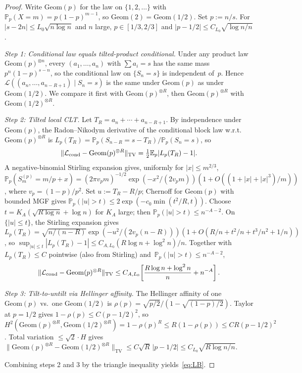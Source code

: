 \documentclass[11pt,a4paper]{amsart}
\theoremstyle{plain}
\theoremstyle{definition}
\newcommand{\E}{\mathbb{E}}
\newcommand{\PP}{\mathbb{P}}
\newcommand{\TV}{\mathrm{TV}}
\newcommand{\Geom}{\mathrm{Geom}}
\begin{document}
\begin{proof}
Write $\Geom(p)$ for the law on $\{1,2,\dots\}$ with $\PP_p(X=m)=p(1-p)^{m-1}$,
so $\Geom(2)=\Geom(1/2)$.
Set $p:=n/s$.
For $|s-2n|\le L_0\sqrt{n\log n}$ and $n$ large, $p\in[1/3,2/3]$ and
$|p-1/2|\le C_{L_0}\sqrt{\log n/n}$.

\smallskip\noindent\emph{Step 1: Conditional law equals tilted-product conditional.}
Under any product law $\Geom(p)^{\otimes n}$, every $(a_1,\dots,a_n)$ with
$\sum a_i=s$ has the same mass $p^n(1-p)^{s-n}$, so the conditional law on
$\{S_n=s\}$ is independent of~$p$.
Hence
$\mathcal L((a_n,\dots,a_{n-R+1})\mid S_n=s)$ is the same under $\Geom(p)$
as under $\Geom(1/2)$.
We compare it first with $\Geom(p)^{\otimes R}$, then $\Geom(p)^{\otimes R}$
with $\Geom(1/2)^{\otimes R}$.

\smallskip\noindent\emph{Step 2: Tilted local CLT.}
Let $T_R=a_n+\cdots+a_{n-R+1}$.
By independence under $\Geom(p)$, the Radon--Nikodym derivative of the
conditional block law w.r.t.\ $\Geom(p)^{\otimes R}$ is
$L_p(T_R)=\PP_p(S_{n-R}=s-T_R)/\PP_p(S_n=s)$, so
\begin{equation}\label{eq:LB-RN}
\|\mathcal L_{\rm cond}-\Geom(p)^{\otimes R}\|_{\TV}=\tfrac12\E_p|L_p(T_R)-1|.
\end{equation}
A negative-binomial Stirling expansion gives, uniformly for $|x|\le m^{2/3}$,
$\PP_p(S_m^{(p)}=m/p+x)=(2\pi v_p m)^{-1/2}\exp(-x^2/(2v_p m))(1+O((1+|x|+|x|^3)/m))$,
where $v_p=(1-p)/p^2$.
Set $u:=T_R-R/p$; Chernoff for $\Geom(p)$ with bounded MGF gives
$\PP_p(|u|>t)\le 2\exp(-c_0\min(t^2/R,t))$.
Choose $t=K_A(\sqrt{R\log n}+\log n)$ for $K_A$ large; then $\PP_p(|u|>t)\le n^{-A-2}$.
On $\{|u|\le t\}$, the Stirling expansion gives
$L_p(T_R)=\sqrt{n/(n-R)}\exp(-u^2/(2v_p(n-R)))(1+O(R/n+t^2/n+t^3/n^2+1/n))$,
so $\sup_{|u|\le t}|L_p(T_R)-1|\le C_{A,L_0}(R\log n+\log^2 n)/n$.
Together with $L_p(T_R)\le C$ pointwise (also from Stirling) and~$\PP_p(|u|>t)\le n^{-A-2}$,
\begin{equation}\label{eq:LB-step2}
\|\mathcal L_{\rm cond}-\Geom(p)^{\otimes R}\|_{\TV}\le C_{A,L_0}\!\left[\frac{R\log n+\log^2 n}{n}+n^{-A}\right].
\end{equation}

\smallskip\noindent\emph{Step 3: Tilt-to-untilt via Hellinger affinity.}
The Hellinger affinity of one $\Geom(p)$ vs.\ one $\Geom(1/2)$ is
$\rho(p)=\sqrt{p/2}/(1-\sqrt{(1-p)/2})$.
Taylor at $p=1/2$ gives $1-\rho(p)\le C(p-1/2)^2$, so
$H^2(\Geom(p)^{\otimes R},\Geom(1/2)^{\otimes R})=1-\rho(p)^R\le R(1-\rho(p))\le CR(p-1/2)^2$.
Total variation $\le\sqrt 2\cdot H$ gives
$\|\Geom(p)^{\otimes R}-\Geom(1/2)^{\otimes R}\|_{\TV}\le C\sqrt R\,|p-1/2|\le C_{L_0}\sqrt{R\log n/n}$.

\smallskip
Combining steps 2 and 3 by the triangle inequality yields~\eqref{eq:LB}.
\end{proof}
\end{document}
